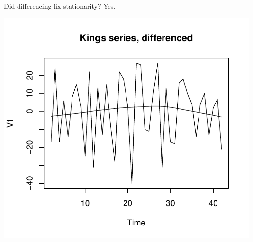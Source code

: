 \begin{frame}[fragile]{Did differencing fix stationarity? Yes.}
  
\begin{knitrout}
\color{fgcolor}\begin{kframe}
\begin{alltt}
\hlstd{=}\hlstd{)}
\hlstd{(}
\end{alltt}
\end{kframe}
\includegraphics[width=\maxwidth]{figure/lsjahjsh-1} 

\end{knitrout}
  
\end{frame}

